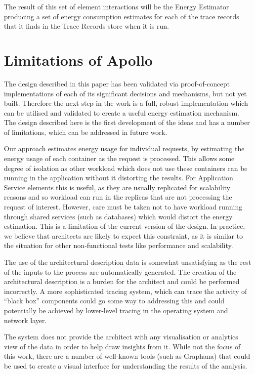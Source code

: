 The result of this set of element interactions will be the Energy Estimator producing a set of energy consumption estimates for each of the trace records that it finds in the Trace Records store when it is run.

\section{Limitations of Apollo}

The design described in this paper has been validated via proof-of-concept implementations of each of its significant decisions and mechanisms, but not yet built.  Therefore the next step in the work is a full, robust implementation which can be utilised and validated to create a useful energy estimation mechanism.
The design described here is the first development of the ideas and has a number of limitations, which can be addressed in future work.

Our approach estimates energy usage for individual requests, by estimating the energy usage of each container as the request is processed.  This allows some degree of isolation as other workload which does not use these containers can be running in the application without it distorting the results.  For Application Service elements this is useful, as they are usually replicated for scalability reasons and so workload can run in the replicas that are not processing the request of interest.  However, care must be taken not to have workload running through shared services (such as databases) which would distort the energy estimation.  This is a limitation of the current version of the design. In practice, we believe that architects are likely to expect this constraint, as it is similar to the situation for other non-functional tests like performance and scalability.

The use of the architectural description data is somewhat unsatisfying as the rest of the inputs to the process are automatically generated.  The creation of the architectural description is a burden for the architect and could be performed incorrectly.  A more sophisticated tracing system, which can trace the activity of “black box” components could go some way to addressing this and could potentially be achieved by lower-level tracing in the operating system and network layer.

The system does not provide the architect with any visualisation or analytics view of the data in order to help draw insights from it.  While not the focus of this work, there are a number of well-known tools (such as Graphana) that could be used to create a visual interface for understanding the results of the analysis.


